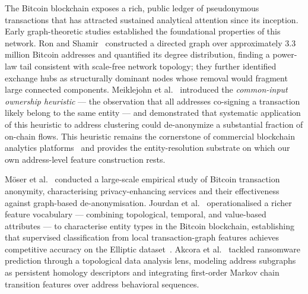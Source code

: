 \documentclass[journal]{IEEEtran}
\begin{document}
The Bitcoin blockchain exposes a rich, public ledger of pseudonymous
transactions that has attracted sustained analytical attention since its
inception.  Early graph-theoretic studies established the foundational
properties of this network.  Ron and Shamir~\cite{Ron2013} constructed a
directed graph over approximately 3.3 million Bitcoin addresses and quantified
its degree distribution, finding a power-law tail consistent with scale-free
network topology; they further identified exchange hubs as structurally
dominant nodes whose removal would fragment large connected components.
Meiklejohn et al.~\cite{Meiklejohn2013} introduced the \emph{common-input
ownership heuristic} --- the observation that all addresses co-signing a
transaction likely belong to the same entity --- and demonstrated that
systematic application of this heuristic to address clustering could de-anonymize
a substantial fraction of on-chain flows.  This heuristic remains the
cornerstone of commercial blockchain analytics platforms~\cite{Chainalysis2023}
and provides the entity-resolution substrate on which our own address-level
feature construction rests.

M\"{o}ser et al.~\cite{Moser2017} conducted a large-scale empirical study of
Bitcoin transaction anonymity, characterising privacy-enhancing services and
their effectiveness against graph-based de-anonymisation.  Jourdan et
al.~\cite{Jourdan2019} operationalised a richer feature vocabulary --- combining
topological, temporal, and value-based attributes --- to characterise entity
types in the Bitcoin blockchain, establishing that supervised classification
from local transaction-graph features achieves competitive accuracy on the
Elliptic dataset~\cite{Weber2019}.  Akcora et al.~\cite{Akcora2022} tackled
ransomware prediction through a topological data analysis lens, modeling address
subgraphs as persistent homology descriptors and integrating first-order Markov
chain transition features over address behavioral sequences.
\end{document}
